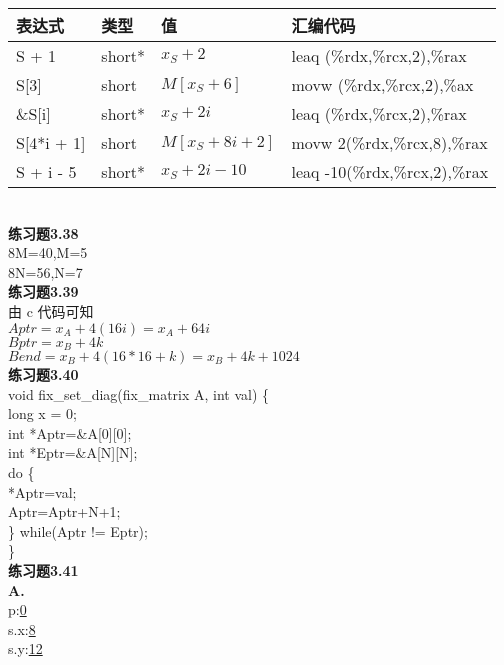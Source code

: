 \documentclass{article}
\begin{document}
\begin{CJK}{UTF8}{uyhei}
\begin{table}[htbp]
\begin{tabular}{|m{12em}<{\centering}|m{12em}<{\centering}|m{12em}<{\centering}|m{14em}<{\centering}|}
\hline
表达式		&	类型	&	值		&	汇编代码	\\
\hline
S + 1		&	short*	&	$x_S+2$		&	leaq (\%rdx,\%rcx,2),\%rax	\\
\hline
S[3]		&	short	&	$M[x_S+6]$	&	movw (\%rdx,\%rcx,2),\%ax	\\
\hline
\&S[i]		&	short*	&	$x_S+2i$	&	leaq (\%rdx,\%rcx,2),\%rax	\\
\hline
S[4*i + 1]	&	short	&	$M[x_S+8i+2]$	&	movw 2(\%rdx,\%rcx,8),\%rax	\\
\hline
S + i - 5	&	short*	&	$x_S+2i-10$	&	leaq -10(\%rdx,\%rcx,2),\%rax	\\
\hline
\end{tabular}
\end{table}	\\[2ex]
\textbf{练习题3.38}	\\
8M=40,M=5	\\
8N=56,N=7	\\[2em]
\textbf{练习题3.39}	\\[2ex]
由 c 代码可知	\\
$Aptr=x_A+4(16i)=x_A+64i$	\\
$Bptr=x_B+4k$	\\
$Bend=x_B+4(16*16+k)=x_B+4k+1024$	\\[2ex]
\newpage
\noindent\textbf{练习题3.40}	\\
void fix\_set\_diag(fix\_matrix A, int val) \{	\\
	\hspace*{2em}long x = 0;	\\
	\hspace*{2em}int *Aptr=\&A[0][0];	\\
	\hspace*{2em}int *Eptr=\&A[N][N];	\\
	\hspace*{2em}do \{	\\
		\hspace*{4em}*Aptr=val;	\\
		\hspace*{4em}Aptr=Aptr+N+1;	\\
	\hspace*{2em}\} while(Aptr != Eptr);	\\
\}	\\[3ex]
\textbf{练习题3.41}	\\[1ex]
\textbf{A.}	\\
p:\underline{0}	\\
s.x:\underline{8}	\\
s.y:\underline{12}	\\

\end{CJK}
\end{document}
